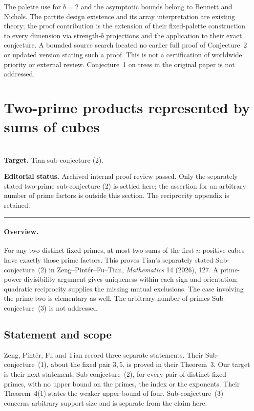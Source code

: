 \documentclass[11pt,a4paper]{article}
\begin{document}
The palette use for $b=2$ and the asymptotic bounds belong to Bennett and Nichols. The partite design existence and its array interpretation are existing theory; the proof contribution is the extension of their fixed-palette construction to every dimension via strength-$b$ projections and the application to their exact conjecture. A bounded source search located no earlier full proof of Conjecture~2 or updated version stating such a proof. This is not a certification of worldwide priority or external review. Conjecture~1 on trees in the original paper is not addressed.
\endgroup


\clearpage

\section{Two-prime products represented by sums of cubes}
\label{section:R16M}
\\[3pt]
\noindent\textbf{Target.} Tian sub-conjecture (2).

\noindent\textbf{Editorial status.} Archived internal proof review passed. Only the separately stated two-prime sub-conjecture (2) is settled here; the assertion for an arbitrary number of prime factors is outside this section. The reciprocity appendix is retained.

\smallskip\hrule\medskip



\begingroup
\newcommand{\ord}{\operatorname{ord}}
\setcounter{equation}{0}
\renewcommand{\theequation}{\thesection.\arabic{equation}}
\renewcommand{\theHequation}{R16M.\arabic{equation}}
\paragraph{Overview.}
For any two distinct fixed primes, at most two sums of the first
$n$ positive cubes have exactly those prime factors. This proves
Tian's separately stated Sub-conjecture~(2) in
Zeng--Pint\'er--Fu--Tian, \emph{Mathematics} 14 (2026), 127.
A prime-power divisibility argument gives uniqueness within each
sign and orientation; quadratic reciprocity supplies the missing
mutual exclusions. The case involving the prime two is elementary
as well. The arbitrary-number-of-primes Sub-conjecture~(3) is not
addressed.


\subsection{Statement and scope}
Zeng, Pint\'er, Fu and Tian \cite[\S1]{R16M:Tian} record three separate
statements. Their Sub-conjecture~(1), about the fixed pair $3,5$,
is proved in their Theorem~3. Our target is their next statement,
Sub-conjecture~(2), for every pair of distinct fixed primes, with
no upper bound on the primes, the index or the exponents.
Their Theorem~4(1) states the weaker upper bound of four.
Sub-conjecture~(3) concerns arbitrary support size and is separate
from the claim here.
\end{document}
